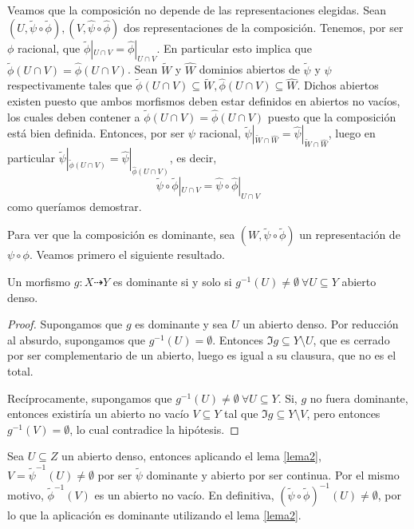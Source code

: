 \documentclass[twoside]{article}
\begin{document}
\begin{solucion}
\begin{enumerate}
Veamos que la composición no depende de las representaciones elegidas. Sean $(U,\tilde{\psi}\circ\tilde{\phi}),(V,\hat{\psi}\circ\hat{\phi})$ dos representaciones de la composición. Tenemos, por ser $\phi$ racional, que $\tilde{\phi}|_{U\cap V}=\hat{\phi}|_{U\cap V}$. En particular esto implica que $\tilde{\phi}(U\cap V)= \hat{\phi}(U\cap V)$. Sean $\tilde{W}$ y $\hat{W}$ dominios abiertos de $\tilde{\psi}$ y $\hat{\psi}$ respectivamente tales que $\tilde{\phi}(U\cap V)\subseteq\tilde{W},\hat{\phi}(U\cap V)\subseteq\hat{W}$. Dichos abiertos existen puesto que ambos morfismos deben estar definidos en abiertos no vacíos, los cuales deben contener a $\tilde{\phi}(U\cap V)=\hat{\phi}(U\cap V)$ puesto que la composición está bien definida.  Entonces, por ser $\psi$ racional, $\tilde{\psi}|_{\tilde{W}\cap\hat{W}}=\hat{\psi}|_{\tilde{W}\cap\hat{W}}$, luego en particular $\tilde{\psi}|_{\tilde{\phi}(U\cap V)}=\hat{\psi}|_{\hat{\phi}(U\cap V)}$, es decir, $$\tilde{\psi}\circ\tilde{\phi}|_{U\cap V}=\hat{\psi}\circ\hat{\phi}|_{U\cap V}$$ como queríamos demostrar.

Para ver que la composición es dominante, sea $(W,\tilde{\psi}\circ\tilde{\phi})$ un representación de $\psi\circ\phi$. Veamos primero el siguiente resultado.

\begin{lemma}\label{lema2}
Un morfismo $g:X\dashrightarrow Y$ es dominante si y solo si $g^{-1}(U)\neq\emptyset\ \forall U\subseteq Y$ abierto denso.
\end{lemma}
\begin{proof}
Supongamos que $g$ es dominante y sea $U$ un abierto denso. Por reducción al absurdo, supongamos que $g^{-1}(U)=\emptyset$. Entonces $\Im{g}\subseteq Y\setminus U$, que es cerrado por ser complementario de un abierto, luego es igual a su clausura, que no es el total.

Recíprocamente, supongamos que $g^{-1}(U)\neq\emptyset\ \forall U\subseteq Y$. Si, $g$ no fuera dominante, entonces existiría un abierto no vacío $V\subseteq Y$ tal que $\Im{g}\subseteq Y\setminus V$, pero entonces $g^{-1}(V)=\emptyset$, lo cual contradice la hipótesis.

\end{proof}

 Sea $U\subseteq Z$ un abierto denso, entonces aplicando el lema \ref{lema2}, $V=\tilde{\psi}^{-1}(U)\neq\emptyset$ por ser $\tilde{\psi}$ dominante y abierto por ser continua.  Por el mismo motivo, $\tilde{\phi}^{-1}(V)$ es un abierto no vacío. En definitiva, $(\tilde{\psi}\circ\tilde{\phi})^{-1}(U)\neq\emptyset$, por lo que la aplicación es dominante utilizando el lema \ref{lema2}.

\end{enumerate}
\end{solucion}
\end{document}
